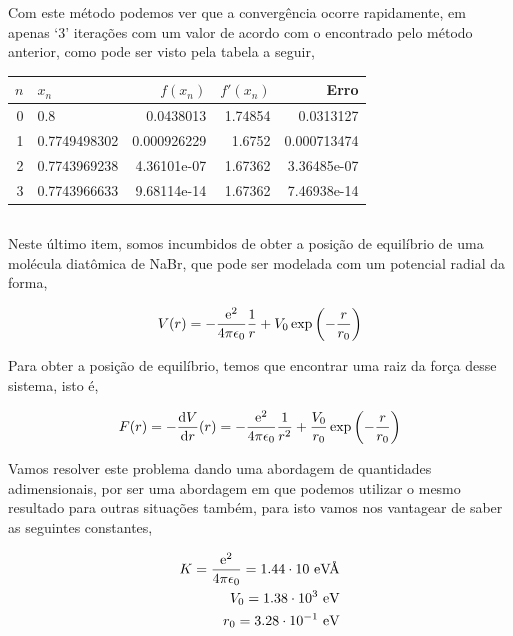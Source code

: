 \documentclass[twoside]{amsart}
\numberwithin{equation}{section}
\begin{document}
Com este método podemos ver que a convergência ocorre rapidamente, em apenas `$3$' iterações com um valor de acordo com 
o encontrado pelo método anterior, como pode ser visto pela tabela a seguir,

\centering
\begin{tabular}{rlrrr}
    \hline
       $n$ & $x_n$                &      $f(x_n)$ &   $f'(x_n)$ &        Erro \\
    \hline
       0 & 0.8                & 0.0438013   &   1.74854 & 0.0313127   \\
       1 & 0.7749498302       & 0.000926229 &   1.6752  & 0.000713474 \\
       2 & 0.7743969238       & 4.36101e-07 &   1.67362 & 3.36485e-07 \\
       3 & 0.7743966633 & 9.68114e-14 &   1.67362 & 7.46938e-14 \\
    \hline
\end{tabular}

\justifying

\subsection{}

Neste último item, somos incumbidos de obter a posição de equilíbrio de uma molécula diatômica de NaBr, que pode ser modelada 
com um potencial radial da forma,

\begin{align}
    V\qty(r) = -\frac{\textnormal{e}^2}{4\pi\epsilon_0}\frac1r+V_0\exp\qty(-\frac{r}{r_0})
\end{align}

Para obter a posição de equilíbrio, temos que encontrar uma raiz da força desse sistema, isto é,

\begin{align}
    F\qty(r)= -\dv{V}{r}\qty(r)=-\frac{\textnormal{e}^2}{4\pi\epsilon_0}\frac{1}{r^2}+\frac{V_0}{r_0}\exp\qty(-\frac{r}{r_0})
\end{align}

Vamos resolver este problema dando uma abordagem de quantidades adimensionais, por ser uma abordagem em que podemos utilizar 
o mesmo resultado para outras situações também, para isto vamos nos vantagear de saber as seguintes constantes,

\begin{align}
    K = \frac{\e^2}{4\pi\epsilon_0} = 1.44\cdot 10\ \e\textnormal{V\AA}\\
    V_0 = 1.38\cdot 10^{3}\ \e\textnormal{V}\\
    r_0 = 3.28\cdot 10^{-1}\ \e\textnormal{V}
\end{align}
\end{document}
